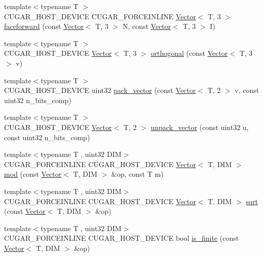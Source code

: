 \begin{DoxyCompactItemize}
\item 
{\footnotesize template$<$typename T $>$ }\\C\+U\+G\+A\+R\+\_\+\+H\+O\+S\+T\+\_\+\+D\+E\+V\+I\+CE C\+U\+G\+A\+R\+\_\+\+F\+O\+R\+C\+E\+I\+N\+L\+I\+NE \hyperlink{structcugar_1_1_vector}{Vector}$<$ T, 3 $>$ \hyperlink{group___vectors_module_ga62cacaa60db461c2298a9a51ab9128bc}{faceforward} (const \hyperlink{structcugar_1_1_vector}{Vector}$<$ T, 3 $>$ N, const \hyperlink{structcugar_1_1_vector}{Vector}$<$ T, 3 $>$ I)
\item 
{\footnotesize template$<$typename T $>$ }\\C\+U\+G\+A\+R\+\_\+\+H\+O\+S\+T\+\_\+\+D\+E\+V\+I\+CE \hyperlink{structcugar_1_1_vector}{Vector}$<$ T, 3 $>$ \hyperlink{group___vectors_module_gadb782eb379c7b928c89790191e3bd692}{orthogonal} (const \hyperlink{structcugar_1_1_vector}{Vector}$<$ T, 3 $>$ v)
\item 
{\footnotesize template$<$typename T $>$ }\\C\+U\+G\+A\+R\+\_\+\+H\+O\+S\+T\+\_\+\+D\+E\+V\+I\+CE uint32 \hyperlink{group___vectors_module_ga338c773d1de0c975ff611a6a56782976}{pack\+\_\+vector} (const \hyperlink{structcugar_1_1_vector}{Vector}$<$ T, 2 $>$ v, const uint32 n\+\_\+bits\+\_\+comp)
\item 
{\footnotesize template$<$typename T $>$ }\\C\+U\+G\+A\+R\+\_\+\+H\+O\+S\+T\+\_\+\+D\+E\+V\+I\+CE \hyperlink{structcugar_1_1_vector}{Vector}$<$ T, 2 $>$ \hyperlink{group___vectors_module_gafdac23f56276bd0a852d92a786723633}{unpack\+\_\+vector} (const uint32 u, const uint32 n\+\_\+bits\+\_\+comp)
\item 
{\footnotesize template$<$typename T , uint32 D\+IM$>$ }\\C\+U\+G\+A\+R\+\_\+\+F\+O\+R\+C\+E\+I\+N\+L\+I\+NE C\+U\+G\+A\+R\+\_\+\+H\+O\+S\+T\+\_\+\+D\+E\+V\+I\+CE \hyperlink{structcugar_1_1_vector}{Vector}$<$ T, D\+IM $>$ \hyperlink{group___vectors_module_gaa57bce082b9fdb795f14b78abe5dd4f9}{mod} (const \hyperlink{structcugar_1_1_vector}{Vector}$<$ T, D\+IM $>$ \&op, const T m)
\item 
{\footnotesize template$<$typename T , uint32 D\+IM$>$ }\\C\+U\+G\+A\+R\+\_\+\+F\+O\+R\+C\+E\+I\+N\+L\+I\+NE C\+U\+G\+A\+R\+\_\+\+H\+O\+S\+T\+\_\+\+D\+E\+V\+I\+CE \hyperlink{structcugar_1_1_vector}{Vector}$<$ T, D\+IM $>$ \hyperlink{group___vectors_module_ga82ffe653d8df9532076d7c6c9f254291}{sqrt} (const \hyperlink{structcugar_1_1_vector}{Vector}$<$ T, D\+IM $>$ \&op)
\item 
{\footnotesize template$<$typename T , uint32 D\+IM$>$ }\\C\+U\+G\+A\+R\+\_\+\+F\+O\+R\+C\+E\+I\+N\+L\+I\+NE C\+U\+G\+A\+R\+\_\+\+H\+O\+S\+T\+\_\+\+D\+E\+V\+I\+CE bool \hyperlink{group___vectors_module_gaf2a8279368671ac3504889251ac8ddc6}{is\+\_\+finite} (const \hyperlink{structcugar_1_1_vector}{Vector}$<$ T, D\+IM $>$ \&op)
\end{DoxyCompactItemize}


